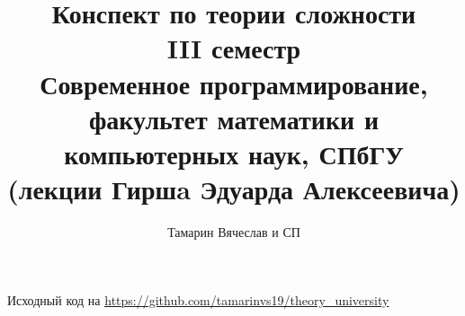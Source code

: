 \documentclass[11pt]{report}
\title{Конспект по теории сложности\\III семестр\\
    Современное программирование, факультет математики и компьютерных наук, СПбГУ\\
(лекции Гиршa Эдуарда Алексеевича)}
\author{Тамарин Вячеслав и СП}
\begin{document}
\maketitle
\tableofcontents
\hspace{1em}
\begin{center}
	Исходный код на \url{https://github.com/tamarinvs19/theory_university}
\end{center}

\printindex
 
 
 
 

 
\newpage
 
\end{document}
